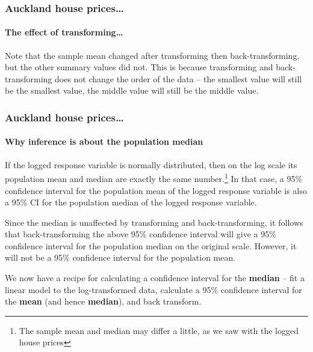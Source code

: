 \documentclass{beamer}\usepackage[]{graphicx}\usepackage[]{xcolor}
\begin{document}
\begin{frame}[fragile]
\frametitle{Auckland house prices\ldots}
\framesubtitle{The effect of transforming\ldots}

Note that the sample mean changed after transforming then back-transforming, but the other summary values did not. This is because transforming and back-transforming does not change the order of the data -- the smallest value will still be the smallest value, the middle value will still be the middle value.

\end{frame}



\begin{frame}[fragile]
\frametitle{Auckland house prices\ldots}
\framesubtitle{Why inference is about the population median}
If the logged response variable is normally distributed, then on the log scale its population mean and median are exactly the same number.\footnote{The sample mean and median may differ a little, as we saw with the logged house prices} 
In that case, a 95\% confidence interval for the population mean of the logged response variable is also a 95\% CI for the population median of the logged response variable.
\medskip

Since the median is unaffected by transforming and back-transforming, it follows that back-transforming the above 95\% confidence interval will give a 95\% confidence interval for the population median on the original scale. However, it will not be a 95\% confidence interval for the population mean.
\medskip

We now have a recipe for calculating a confidence interval for the {\bf median} -- fit a linear model to the log-transformed data, calculate a 95\% confidence interval for the {\bf mean} (and hence {\bf median}), and back transform.
\end{frame}
\end{document}
